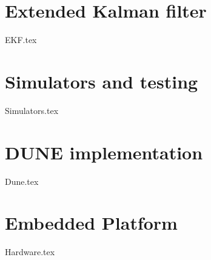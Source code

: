 \graphicspath{{Implementation/}}
\label{ch:implementation}


\section{Extended Kalman filter}
\label{seq:EKF-Imp}
    {EKF.tex}

\section{Simulators and testing}
    {Simulators.tex}

\section{DUNE implementation}
    {Dune.tex}

\section{Embedded Platform}
    {Hardware.tex}

        


%           
        
